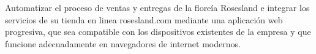 Automatizar el proceso de ventas y entregas de la floreía Rosesland 
e integrar los servicios de su tienda en linea rosesland.com 
mediante una aplicación web progresiva, que sea compatible con los dispositivos existentes de la empresa
y que funcione adecuadamente en navegadores de internet modernos.